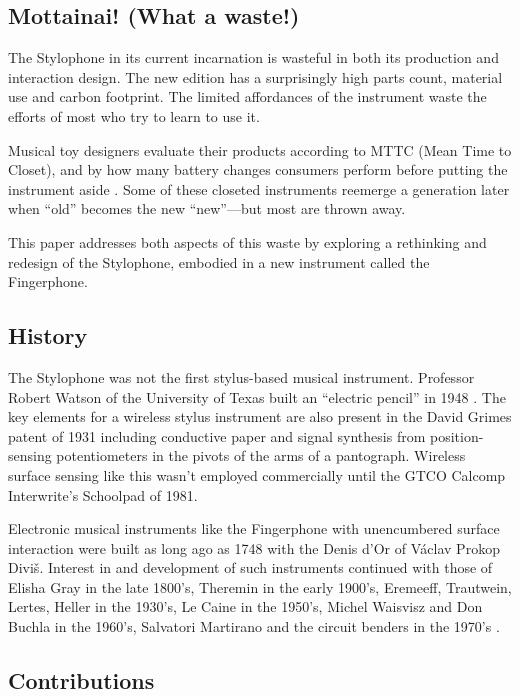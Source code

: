 \subsection{Mottainai! (What a waste!)}

The Stylophone in its current incarnation is wasteful in both its production and interaction design. The new edition has a surprisingly high parts count, material use and carbon footprint. The limited affordances of the instrument waste the efforts of most who try to learn to use it.

Musical toy designers evaluate their products according to MTTC (Mean Time to Closet), and by how many battery changes consumers perform before putting the instrument aside \cite{Capps:2011}. Some of these closeted instruments reemerge a generation later when ``old'' becomes the new ``new''---but most are thrown away.

This paper addresses both aspects of this waste by exploring a rethinking and redesign of the Stylophone, embodied in a new instrument called the Fingerphone.

\subsection{History}

The Stylophone was not the first stylus-based musical instrument. Professor Robert Watson of the University of Texas built an ``electric pencil'' in 1948 \cite{Anonymous:1948}. The key elements for a wireless stylus instrument are also present in the David Grimes patent of 1931 \cite{Anonymous:1948} including conductive paper and signal synthesis from position-sensing potentiometers in the pivots of the arms of a pantograph. Wireless surface sensing like this wasn't employed commercially until the GTCO Calcomp Interwrite's Schoolpad of 1981.

Electronic musical instruments like the Fingerphone with unencumbered surface interaction were built as long ago as 1748 with the Denis d'Or of V\'{a}clav Prokop Divi\v{s}. Interest in and development of such instruments continued with those of Elisha Gray in the late 1800's, Theremin in the early 1900's, Eremeeff, Trautwein, Lertes, Heller in the 1930's, Le Caine in the 1950's, Michel Waisvisz and Don Buchla in the 1960's, Salvatori Martirano and the circuit benders in the 1970's \cite{Roads:1996a}.

\subsection{Contributions}

